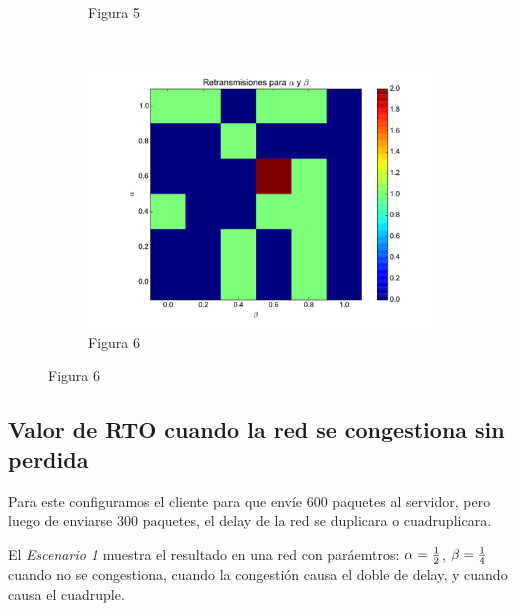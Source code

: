 \begin{figure}[H]
\begin{subfigure}{0.32\textwidth}
		    \caption*{Figura 5}
	    \end{subfigure}
	    ~
	    \begin{subfigure}{0.32\textwidth}
		    \includegraphics[width=1.0\textwidth]{imagenes/retransmisiones_300.pdf}
		    \caption*{Figura 6}
	    \end{subfigure}
	
    \end{figure}    


	\newpage
    \subsection{Valor de RTO cuando la red se congestiona sin perdida}
        Para este configuramos el cliente para que env\'ie 600 paquetes al
        servidor, pero luego de enviarse 300 paquetes, el delay de la red
        se duplicara o cuadruplicara. 
        
        El \emph{Escenario 1} muestra el resultado en una red con
        par\'aemtros: $\alpha={{1}\over{2}}$, $\beta={{1}\over{4}}$
        cuando no se congestiona, cuando la congesti\'on causa el doble de
        delay, y cuando causa el cuadruple.
  
